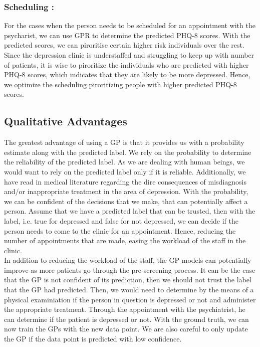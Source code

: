 \documentclass{article}
\begin{document}
	\subsubsection{Scheduling :}
	For the cases when the person needs to be scheduled for an appointment with the psycharist, we can use GPR to determine the predicted PHQ-8 scores. 
	With the predicted scores, we can piroritise certain higher risk individuals over the rest. 
	Since the depression clinic is understaffed and struggling to keep up with number of patients, it is wise to piroritize the individuals who are predicted with higher PHQ-8 scores, which indicates that they are likely to be more depressed. 
	Hence, we optimize the scheduling piroritizing people with higher predicted PHQ-8 scores.

	\subsection{Qualitative Advantages}
	The greatest advantage of using a GP is that it provides us with a probability estimate along with the predicted label. 
	We rely on the probability to determine the reliability of the predicted label. 
	As we are dealing with human beings, we would want to rely on the predicted label only if it is reliable. 
	Additionally, we have read in medical literature regarding the dire consequences of misdiagnosis and/or inappropriate treatment\cite{nasrallah2015consequences,bowden2001strategies,dunner2003clinical} in the area of depression. 
	With the probability, we can be confident of the decisions that we make, that can potentially affect a person. 
	Assume that we have a predicted label that can be trusted, then with the label, i.e. true for depressed and false for not depressed, we can decide if the person needs to come to the clinic for an appointment. 
	Hence, reducing the number of appointments that are made, easing the workload of the staff in the clinic. \\
	
	In addition to reducing the workload of the staff, the GP models can potentially improve as more patients go through the pre-screening process.
	It can be the case that the GP is not confident of its prediction, then we should not trust the label that the GP had predicted. 
	Then, we would need to determine by the means of a physical examiniation if the person in question is depressed or not and administer the appropriate treatment. 
	Through the appointment with the psychiatrist, he can determine if the patient is depressed or not. 
	With the ground truth, we can now train the GPs with the new data point. We are also careful to only update the GP if the data point is predicted with low confidence. \\
\end{document}
